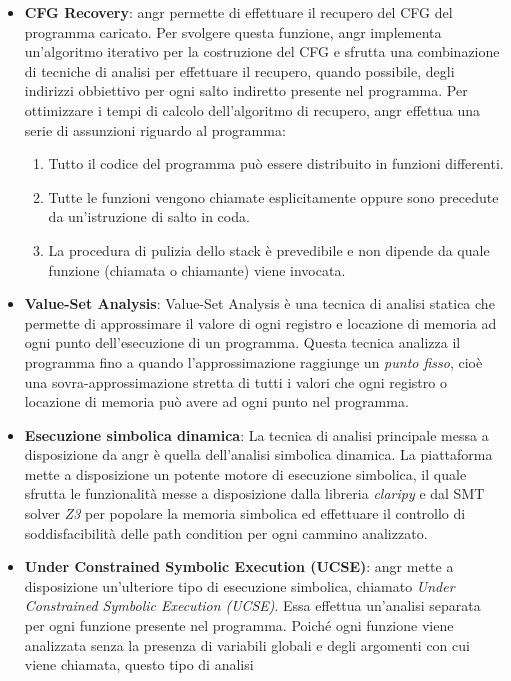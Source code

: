 \documentclass[../main.tex]{subfiles}
\begin{document}
\begin{itemize}
    \item \textbf{CFG Recovery}: angr permette di effettuare il recupero del CFG del programma caricato. Per svolgere questa funzione, angr implementa un'algoritmo iterativo per la costruzione del CFG e sfrutta una combinazione
    di tecniche di analisi per effettuare il recupero, quando possibile, degli indirizzi obbiettivo per ogni salto indiretto presente nel programma. Per ottimizzare i tempi di calcolo dell'algoritmo di recupero, angr effettua una serie di assunzioni riguardo
    al programma:
    \begin{enumerate}
        \item Tutto il codice del programma può essere distribuito in funzioni differenti.
        \item Tutte le funzioni vengono chiamate esplicitamente oppure sono precedute da un'istruzione di salto in coda.
        \item La procedura di pulizia dello stack è prevedibile e non dipende da quale funzione (chiamata o chiamante) viene invocata.
    \end{enumerate}
    \item \textbf{Value-Set Analysis}: Value-Set Analysis è una tecnica di analisi statica che permette di approssimare il valore di ogni registro e locazione di memoria ad ogni punto dell'esecuzione di un programma.
    Questa tecnica analizza il programma fino a quando l'approssimazione raggiunge un \textit{punto fisso}, cioè una sovra-approssimazione stretta di tutti i valori che ogni registro o locazione di memoria può avere ad ogni punto nel programma.
    \item \textbf{Esecuzione simbolica dinamica}: La tecnica di analisi principale messa a disposizione da angr è quella dell'analisi simbolica dinamica. La piattaforma mette a disposizione un potente motore di esecuzione simbolica, il quale sfrutta
    le funzionalità messe a disposizione dalla libreria \textit{claripy} e dal SMT solver \textit{Z3} per popolare la memoria simbolica ed effettuare il controllo di soddisfacibilità delle path condition per ogni cammino analizzato.
    \item \textbf{Under Constrained Symbolic Execution (UCSE)}: angr mette a disposizione un'ulteriore tipo di esecuzione simbolica, chiamato \textit{Under Constrained Symbolic Execution (UCSE)}. Essa effettua un'analisi separata per ogni funzione presente nel programma. Poiché ogni funzione viene analizzata senza la presenza di variabili globali e degli argomenti con cui viene chiamata, questo tipo di analisi

\end{itemize}
\end{document}
